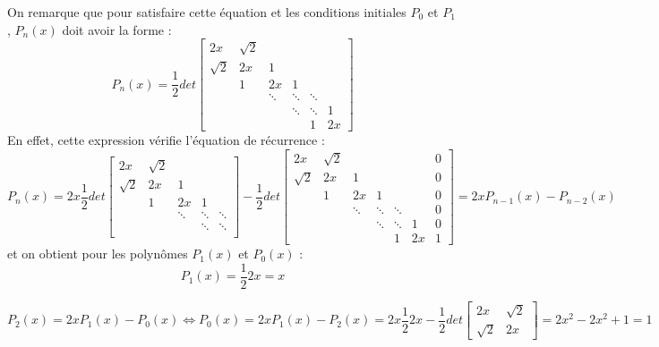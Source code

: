 \documentclass{article}
\begin{document}
On remarque que pour satisfaire cette équation et les conditions initiales $P_0$ et $P_1$, $P_n(x)$ doit avoir la forme : 
$$P_n(x) = \dfrac{1}{2} det
\left[ 
\begin{array}{cccccc}
2x & \sqrt{2} & & & &  \\
\sqrt{2} & 2x & 1 & & & \\
 & 1 & 2x & 1 & & \\
 & & \ddots & \ddots & \ddots & \\
 & & & \ddots & \ddots &  1\\
 & & & &  1 & 2x
\end{array}
\right] 
$$
En effet, cette expression vérifie l'équation de récurrence : 
$$P_n(x) = 2x \dfrac{1}{2} det
\left[ 
\begin{array}{ccccc}
2x & \sqrt{2} & & &  \\
\sqrt{2} & 2x & 1 & & \\
 & 1 & 2x & 1 & \\
 & & \ddots & \ddots & \ddots  \\
 & & & \ddots & \ddots   \\
\end{array}
\right] - \dfrac{1}{2} det
\left[ 
\begin{array}{ccccccc}
2x & \sqrt{2} & & & & & 0 \\
\sqrt{2} & 2x & 1 & & & & 0\\
 & 1 & 2x & 1 & & & 0\\
 & & \ddots & \ddots & \ddots & & 0\\
 & & & \ddots & \ddots &  1 & 0\\
 & & & &  1 & 2x & 1
\end{array}
\right] = 2xP_{n-1}(x)-P_{n-2}(x)$$
et on obtient pour les polynômes $P_1(x)$ et $P_0(x)$ : 
$$P_1(x)=\dfrac{1}{2} 2x = x $$

$$P_2(x)=2xP_1(x) - P_0(x) \Longleftrightarrow P_0(x) = 2xP_1(x) - P_2(x) = 2x \dfrac{1}{2} 2x - \dfrac{1}{2} det
\left[ 
\begin{array}{cc}
2x & \sqrt{2} \\
\sqrt{2} & 2x
\end{array}
\right] = 2x^2 - 2x^2 + 1 = 1$$
\end{document}
